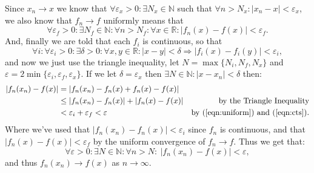 \documentclass{article}
\def \N {\mathbb{N}}
\def \R {\mathbb{R}}
\begin{document}
Since $x_n\to x$ we know that $\forall\varepsilon_x>0: \exists N_x\in\N$ such that $\forall n>N_x: |x_n-x|<\varepsilon_x$, we also know that $f_n\to f$ uniformly means that
	\begin{equation}\label{eqn:uniform}
		\forall\varepsilon_f>0: \exists N_f\in\N: \forall n>N_f: \forall x\in\R:
		|f_n(x)-f(x)|<\varepsilon_f.
	\end{equation}
And, finally we are told that each $f_i$ is continuous, so that
	\begin{equation}\label{eqn:cts}
		\forall i: \forall\varepsilon_i>0: \exists\delta>0: \forall x,y\in\R:
		|x-y|<\delta \Rightarrow |f_i(x) - f_i(y)|<\varepsilon_i,
	\end{equation}
and now we just use the triangle inequality, let $N=\max\{N_i,N_f,N_x\}$ and $\varepsilon =2\min\{\varepsilon_i,\varepsilon_f,\varepsilon_x\}$. If we let $\delta=\varepsilon_x$ then $\exists N\in\N: |x-x_n|<\delta$ then:
	\begin{align*}
		|f_n(x_n) - f(x)| &= |f_n(x_n) -f_n(x) + f_n(x)-f(x)| &\\
		&\leq |f_n(x_n) - f_n(x)| + |f_n(x)-f(x)| &\textrm{by the Triangle Inequality}\\
		&< \varepsilon_i + \varepsilon_f  < \varepsilon 
		&\textrm{by (\ref{eqn:uniform}) and (\ref{eqn:cts})}.
	\end{align*}
Where we've used that $|f_n(x_n)-f_n(x)|<\varepsilon_i$ since $f_n$ is continuous, and that $|f_n(x)-f(x)|<\varepsilon_f$ by the uniform convergence of $f_n\to f$. Thus we get that:
	\[
		\forall\varepsilon>0 :\exists N\in\N: \forall n>N:\ 
		|f_n(x_n) - f(x)|<\varepsilon,
	\]
and thus $f_n(x_n) \to f(x)$ as $n\to\infty$.
\end{document}
